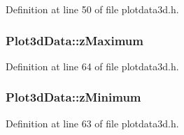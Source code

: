 Definition at line 50 of file plotdata3d.\-h.

\hypertarget{group___scope_plugin_ga1ad4417e8b0fb7035d1f4c85191812a0}{
\subsubsection[{z\-Maximum}]{ Plot3d\-Data\-::z\-Maximum\hspace{0.3cm}{\ttfamily [protected]}}}\label{group___scope_plugin_ga1ad4417e8b0fb7035d1f4c85191812a0}


Definition at line 64 of file plotdata3d.\-h.

\hypertarget{group___scope_plugin_ga0938aa53ec304cabf25b8294dde0a5b0}{
\subsubsection[{z\-Minimum}]{ Plot3d\-Data\-::z\-Minimum\hspace{0.3cm}{\ttfamily [protected]}}}\label{group___scope_plugin_ga0938aa53ec304cabf25b8294dde0a5b0}


Definition at line 63 of file plotdata3d.\-h.

